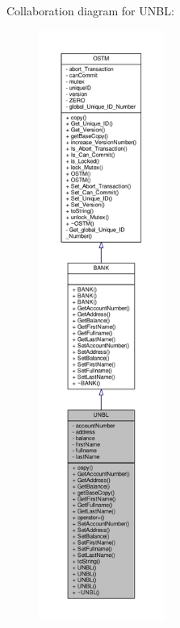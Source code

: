 Collaboration diagram for U\+N\+BL\+:\nopagebreak
\begin{figure}[H]
\begin{center}
\leavevmode
\includegraphics[height=550pt]{class_u_n_b_l__coll__graph}
\end{center}
\end{figure}
